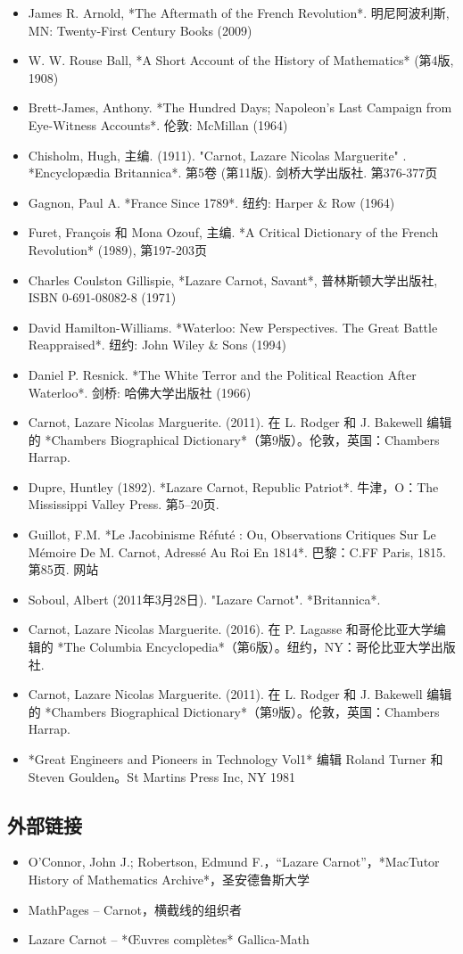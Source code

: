 \begin{itemize}
\item James R. Arnold, *The Aftermath of the French Revolution*. 明尼阿波利斯, MN: Twenty-First Century Books (2009)  
\item W. W. Rouse Ball, *A Short Account of the History of Mathematics* (第4版, 1908)  
\item Brett-James, Anthony. *The Hundred Days; Napoleon's Last Campaign from Eye-Witness Accounts*. 伦敦: McMillan (1964)  
\item Chisholm, Hugh, 主编. (1911). "Carnot, Lazare Nicolas Marguerite" . *Encyclopædia Britannica*. 第5卷 (第11版). 剑桥大学出版社. 第376-377页  
\item Gagnon, Paul A. *France Since 1789*. 纽约: Harper & Row (1964)  
\item Furet, François 和 Mona Ozouf, 主编. *A Critical Dictionary of the French Revolution* (1989), 第197-203页  
\item Charles Coulston Gillispie, *Lazare Carnot, Savant*, 普林斯顿大学出版社, ISBN 0-691-08082-8 (1971)  
\item David Hamilton-Williams. *Waterloo: New Perspectives. The Great Battle Reappraised*. 纽约: John Wiley & Sons (1994)  
\item Daniel P. Resnick. *The White Terror and the Political Reaction After Waterloo*. 剑桥: 哈佛大学出版社 (1966)
\item Carnot, Lazare Nicolas Marguerite. (2011). 在 L. Rodger 和 J. Bakewell 编辑的 *Chambers Biographical Dictionary*（第9版）。伦敦，英国：Chambers Harrap.  
\item Dupre, Huntley (1892). *Lazare Carnot, Republic Patriot*. 牛津，O：The Mississippi Valley Press. 第5–20页.  
\item Guillot, F.M. *Le Jacobinisme Réfuté : Ou, Observations Critiques Sur Le Mémoire De M. Carnot, Adressé Au Roi En 1814*. 巴黎：C.FF Paris, 1815. 第85页. 网站  
\item Soboul, Albert (2011年3月28日). "Lazare Carnot". *Britannica*.  
\item Carnot, Lazare Nicolas Marguerite. (2016). 在 P. Lagasse 和哥伦比亚大学编辑的 *The Columbia Encyclopedia*（第6版）。纽约，NY：哥伦比亚大学出版社.  
\item Carnot, Lazare Nicolas Marguerite. (2011). 在 L. Rodger 和 J. Bakewell 编辑的 *Chambers Biographical Dictionary*（第9版）。伦敦，英国：Chambers Harrap.  
\item *Great Engineers and Pioneers in Technology Vol1* 编辑 Roland Turner 和 Steven Goulden。St Martins Press Inc, NY 1981
\end{itemize}
\subsection{外部链接}
\begin{itemize}
\item O'Connor, John J.; Robertson, Edmund F.，“Lazare Carnot”，*MacTutor History of Mathematics Archive*，圣安德鲁斯大学  
\item MathPages – Carnot，横截线的组织者  
\item Lazare Carnot – *Œuvres complètes* Gallica-Math
\end{itemize}